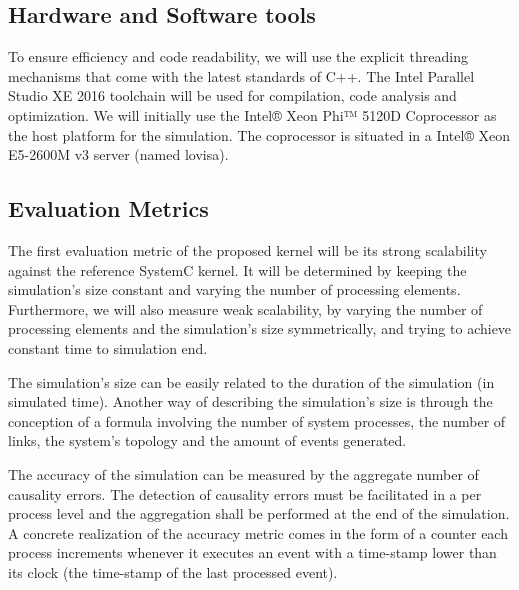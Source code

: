 \documentclass[12pt,twoside]{article}
\begin{document}
\subsection{Hardware and Software tools}
\label{sec:orgheadline17}
To ensure efficiency and code readability, we will use the explicit threading mechanisms that come with the latest standards of C++.
The Intel Parallel Studio XE 2016 toolchain will be used for compilation, code analysis and optimization.
We will initially use the Intel® Xeon Phi™ 5120D Coprocessor as the host platform for the simulation.
The coprocessor is situated in a Intel® Xeon E5-2600M v3 server (named lovisa).



\subsection{Evaluation Metrics}
\label{sec:orgheadline18}
The first evaluation metric of the proposed kernel will be its strong scalability against the reference SystemC kernel.
It will be determined by keeping the simulation's size constant and varying the number of processing elements.
Furthermore, we will also measure weak scalability, by varying the number of processing elements and the simulation's size symmetrically,
and trying to achieve constant time to simulation end.

The simulation's size can be easily related to the duration of the simulation (in simulated time).
Another way of describing the simulation's size is through the conception of a formula involving the number of system processes, the number of links, the system's topology and the amount of events generated.

The accuracy of the simulation can be measured by the aggregate number of causality errors.
The detection of causality errors must be facilitated in a per process level and the aggregation shall be performed at the end of the simulation.
A concrete realization of the accuracy metric comes in the form of a counter each process increments whenever it executes an event with a time-stamp lower than its clock (the time-stamp of the last processed event).
\end{document}
